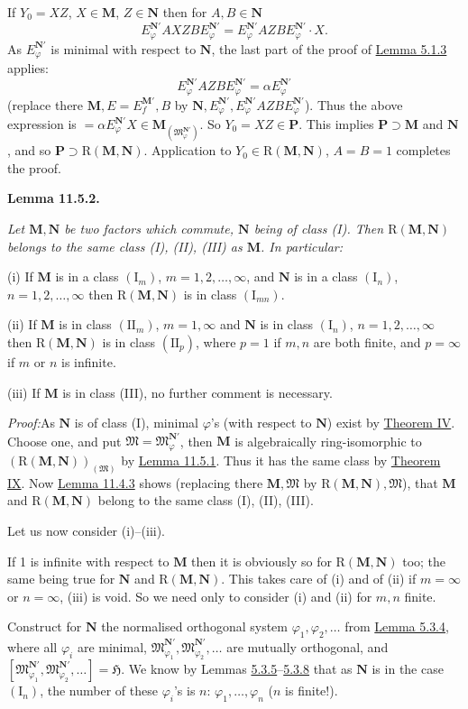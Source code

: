 \documentclass[12pt,b5paper,twoside]{article}
\newcommand{\Hspace}{\mathfrak H}
\newcommand{\M}{\mathbf M}
\newcommand{\N}{\mathbf N}
\renewcommand{\P}{\mathbf P}
\newcommand{\Lemma}[1]{%
  \par\smallskip\noindent\phantomsection\label{lem:#1}\textbf{Lemma #1.}\enspace
}
\newcommand{\Proof}{\par\noindent\textit{Proof:}\enspace}
\newcommand{\lemref}[1]{\hyperref[lem:#1]{Lemma #1}}
\newcommand{\thmref}[1]{\hyperref[thm:#1]{Theorem #1}}
\begin{document}
If $Y_0=XZ$, $X\in\M$, $Z\in\N$ then for $A,B\in\N$
\[
 E_{\varphi}^{\N'}AXZBE_{\varphi}^{\N'}
 =E_{\varphi}^{\N'}AZBE_{\varphi}^{\N'}\cdot X.
\]
As $E_{\varphi}^{\N'}$ is minimal with respect to $\N$, the last part of
the proof of \lemref{5.1.3} applies:
\[
 E_{\varphi}^{\N'}AZBE_{\varphi}^{\N'}=\alpha E_{\varphi}^{\N'}
\]
(replace there $\M,E=E_f^{\M'},B$ by
$\N,E_{\varphi}^{\N'},E_{\varphi}^{\N'}AZBE_{\varphi}^{\N'}$). Thus the
above expression is
$=\alpha E_{\varphi}^{\N'}X\in
\M_{(\mathfrak M_{\varphi}^{\N'})}$. So $Y_0=XZ\in\P$. This implies
$\P\supset\M$ and $\N$, and so $\P\supset\mathrm R(\M,\N)$. Application
to $Y_0\in\mathrm R(\M,\N)$, $A=B=1$ completes the proof.

\Lemma{11.5.2}
{\itshape
Let $\M,\N$ be two factors which commute, $\N$ being of class (I). Then
$\mathrm R(\M,\N)$ belongs to the same class (I), (II), (III) as $\M$.
In particular:

(i) If $\M$ is in a class $(\mathrm I_m)$,
$m=1,2,\ldots,\infty$, and $\N$ is in a class $(\mathrm I_n)$,
$n=1,2,\ldots,\infty$ then $\mathrm R(\M,\N)$ is in class
$(\mathrm I_{mn})$.

(ii) If $\M$ is in class $(\mathrm{II}_m)$, $m=1,\infty$ and $\N$ is in
class $(\mathrm I_n)$, $n=1,2,\ldots,\infty$ then
$\mathrm R(\M,\N)$ is in class $(\mathrm{II}_p)$, where $p=1$ if $m,n$
are both finite, and $p=\infty$ if $m$ or $n$ is infinite.

(iii) If $\M$ is in class (III), no further comment is necessary.}

\Proof As $\N$ is of class (I), minimal $\varphi$'s (with respect to
$\N$) exist by \thmref{IV}. Choose one, and put
$\mathfrak M=\mathfrak M_{\varphi}^{\N'}$, then $\M$ is algebraically
ring-isomorphic to
$(\mathrm R(\M,\N))_{(\mathfrak M)}$ by \lemref{11.5.1}. Thus it has the
same class by \thmref{IX}. Now \lemref{11.4.3} shows (replacing there
$\M,\mathfrak M$ by $\mathrm R(\M,\N),\mathfrak M$), that $\M$ and
$\mathrm R(\M,\N)$ belong to the same class (I), (II), (III).

Let us now consider (i)--(iii).

If 1 is infinite with respect to $\M$ then it is obviously so for
$\mathrm R(\M,\N)$ too; the same being true for $\N$ and
$\mathrm R(\M,\N)$. This takes care of (i) and of (ii) if $m=\infty$ or
$n=\infty$, (iii) is void. So we need only to consider (i) and (ii) for
$m,n$ finite.

Construct for $\N$ the normalised orthogonal system
$\varphi_1,\varphi_2,\ldots$ from \lemref{5.3.4}, where all $\varphi_i$ are
minimal, $\mathfrak M_{\varphi_1}^{\N'},
\mathfrak M_{\varphi_2}^{\N'},\ldots$ are mutually orthogonal, and
$[\mathfrak M_{\varphi_1}^{\N'},
\mathfrak M_{\varphi_2}^{\N'},\ldots]=\Hspace$. We know by Lemmas
\hyperref[lem:5.3.5]{5.3.5}--\hyperref[lem:5.3.8]{5.3.8} that as $\N$ is in the case
$(\mathrm I_n)$, the number of these $\varphi_i$'s is $n$:
$\varphi_1,\ldots,\varphi_n$ ($n$ is finite!).
\end{document}
